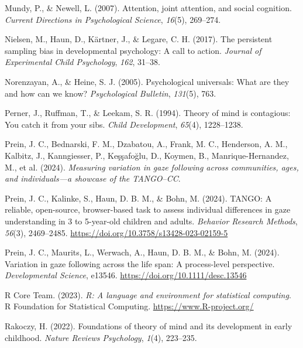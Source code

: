 \documentclass[
  man,floatsintext]{apa7}
\newlength{\cslhangindent}
\newlength{\cslentryspacingunit} %
\newenvironment{CSLReferences}[2] %
 {%
  \setlength{\parindent}{0pt}
  \ifodd #1
  \let\oldpar\par
  \def\par{\hangindent=\cslhangindent\oldpar}
  \fi
  \setlength{\parskip}{#2\cslentryspacingunit}
 }%
 {}
\begin{document}
\begin{CSLReferences}{1}{0}
\leavevmode{}%
Mundy, P., \& Newell, L. (2007). Attention, joint attention, and social cognition. \emph{Current Directions in Psychological Science}, \emph{16}(5), 269--274.

\leavevmode{}%
Nielsen, M., Haun, D., Kärtner, J., \& Legare, C. H. (2017). The persistent sampling bias in developmental psychology: A call to action. \emph{Journal of Experimental Child Psychology}, \emph{162}, 31--38.

\leavevmode{}%
Norenzayan, A., \& Heine, S. J. (2005). Psychological universals: What are they and how can we know? \emph{Psychological Bulletin}, \emph{131}(5), 763.

\leavevmode{}%
Perner, J., Ruffman, T., \& Leekam, S. R. (1994). Theory of mind is contagious: You catch it from your sibs. \emph{Child Development}, \emph{65}(4), 1228--1238.

\leavevmode{}%
Prein, J. C., Bednarski, F. M., Dzabatou, A., Frank, M. C., Henderson, A. M., Kalbitz, J., Kanngiesser, P., Keşşafoğlu, D., Koymen, B., Manrique-Hernandez, M., et al. (2024). \emph{Measuring variation in gaze following across communities, ages, and individuals---a showcase of the TANGO--CC}.

\leavevmode{}%
Prein, J. C., Kalinke, S., Haun, D. B. M., \& Bohn, M. (2024). {TANGO}: {A} reliable, open-source, browser-based task to assess individual differences in gaze understanding in 3 to 5-year-old children and adults. \emph{Behavior Research Methods}, \emph{56}(3), 2469--2485. \url{https://doi.org/10.3758/s13428-023-02159-5}

\leavevmode{}%
Prein, J. C., Maurits, L., Werwach, A., Haun, D. B. M., \& Bohn, M. (2024). Variation in gaze following across the life span: {A} process-level perspective. \emph{Developmental Science}, e13546. \url{https://doi.org/10.1111/desc.13546}

\leavevmode{}%
R Core Team. (2023). \emph{R: A language and environment for statistical computing}. R Foundation for Statistical Computing. \url{https://www.R-project.org/}

\leavevmode{}%
Rakoczy, H. (2022). Foundations of theory of mind and its development in early childhood. \emph{Nature Reviews Psychology}, \emph{1}(4), 223--235.


\end{CSLReferences}
\end{document}
